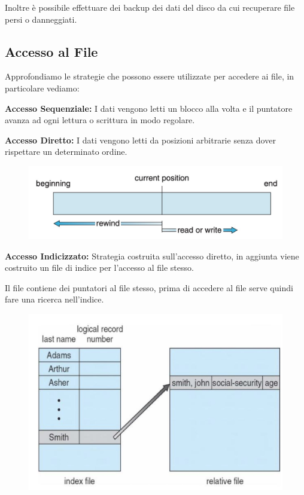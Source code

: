 Inoltre è possibile effettuare dei backup dei dati del disco da cui recuperare file persi o danneggiati.

\subsection{Accesso al File}
Approfondiamo le strategie che possono essere utilizzate per accedere ai file, in particolare vediamo:

\begin{sitemize}
    \item \textbf{Accesso Sequenziale:} I dati vengono letti un blocco alla volta e il puntatore avanza ad ogni lettura o scrittura in modo regolare.

    \item \textbf{Accesso Diretto:} I dati vengono letti da posizioni arbitrarie senza dover rispettare un determinato ordine.

    \begin{figure}[H]
        \centering
        \includegraphics[width=0.5\linewidth]{assets/accesso-diretto.jpg}
    \end{figure}
    \item \textbf{Accesso Indicizzato:} Strategia costruita sull'accesso diretto, in aggiunta viene costruito un file di indice per l'accesso al file stesso.

    Il file contiene dei puntatori al file stesso, prima di accedere al file serve quindi fare una ricerca nell'indice.

    \begin{figure}[H]
        \centering
        \includegraphics[width=0.4\linewidth]{assets/accesso-indicizzato.jpg}
    \end{figure}
\end{sitemize}
